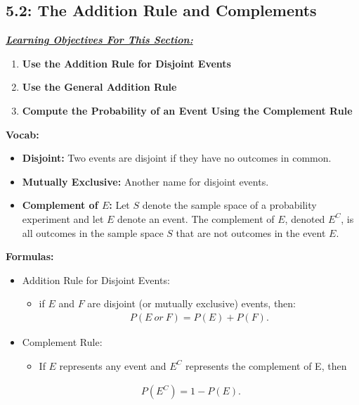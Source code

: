 \documentclass{report}
\begin{document}
    \subsection{5.2: The Addition Rule and Complements}
    \bigbreak \noindent 
    \textbf{\textit{\underline{Learning Objectives For This Section:}}}
    \begin{enumerate}
      \item \textbf{Use the Addition Rule for Disjoint Events}
      \item \textbf{Use the General Addition Rule}
      \item \textbf{Compute the Probability of an Event Using the Complement Rule}
    \end{enumerate}
    \bigbreak \noindent 
    \textbf{Vocab:}
    \begin{itemize}
      \item \textbf{Disjoint:} Two events are disjoint if they have no outcomes in common. 
      \item \textbf{Mutually Exclusive:} Another name for disjoint events.
        \item \textbf{Complement of $E$:} Let $S$ denote the sample space of a probability experiment and let $E$ denote an event. The complement of $E $, denoted $E^{C} $, is all outcomes in the sample space $S $ that are not outcomes in the event $E $.
    \end{itemize}
    \bigbreak \noindent 
    \textbf{Formulas:}
    \begin{itemize}
        \item Addition Rule for Disjoint Events:
            \begin{itemize}
                \item if $E $ and $F $ are disjoint (or mutually exclusive) events, then:
                    \begin{align*}
                        P(E\ or\ F) = P(E) + P(F)
                    .\end{align*}
            \end{itemize}
        \item Complement Rule:
            \begin{itemize}
                \item If $E$ represents any event and $E^{C}$ represents the complement of E, then
            \end{itemize}
            \begin{align*}
                P(E^{C}) = 1-P(E)                
            .\end{align*}
    \end{itemize}
\end{document}
